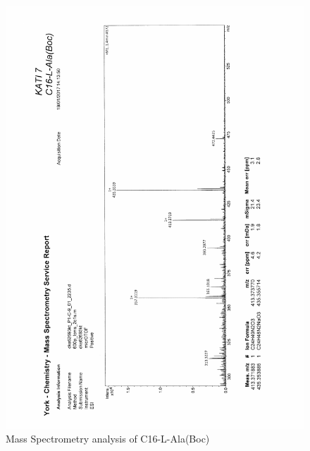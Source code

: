 \begin{figure}[ht!]
\centering
\includegraphics[scale=0.75]{Mass_Spec/KAT1_7.PDF}
\caption{Mass Spectrometry analysis of C16-L-Ala(Boc)}
\end{figure}

